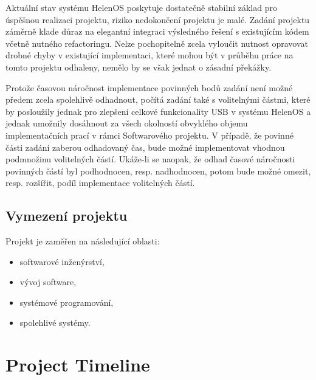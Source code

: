 Aktuální stav systému HelenOS poskytuje dostatečně stabilní základ pro úspěšnou realizaci
projektu, riziko nedokončení projektu je malé. Zadání projektu záměrně klade důraz na elegantní
integraci výsledného řešení s existujícím kódem včetně nutného refactoringu. Nelze pochopitelně
zcela vyloučit nutnost opravovat drobné chyby v existující implementaci, které mohou být
v průběhu práce na tomto projektu odhaleny, nemělo by se však jednat o zásadní překážky.

Protože časovou náročnost implementace povinných bodů zadání není možné předem zcela
spolehlivě odhadnout, počítá zadání také s volitelnými částmi, které by posloužily jednak pro
zlepšení celkové funkcionality USB v systému HelenOS a jednak umožnily dosáhnout za všech
okolností obvyklého objemu implementačních prací v rámci Softwarového projektu. V případě, že
povinné části zadání zaberou odhadovaný čas, bude možné implementovat vhodnou podmnožinu
volitelných částí. Ukáže-li se naopak, že odhad časové náročnosti povinných částí byl
podhodnocen, resp. nadhodnocen, potom bude možné omezit, resp. rozšířit, podíl implementace
volitelných částí.


\subsection{Vymezení projektu}

Projekt je zaměřen na následující oblasti:
~
\begin{itemize}
	\item softwarové inženýrství,
	\item vývoj software,
	\item systémové programování,
	\item spolehlivé systémy.
\end{itemize}


\section{Project Timeline}



